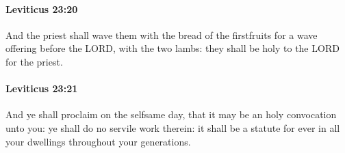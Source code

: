 		\paragraph{Leviticus 23:20} %
			\label{LEVITICUS-23-20}

			And the priest shall wave them with the bread of the firstfruits for a wave offering before the LORD, with the two lambs: they shall be holy to the LORD for the priest.


		\paragraph{Leviticus 23:21} %
			\label{LEVITICUS-23-21}

			And ye shall proclaim on the selfsame day, that it may be an holy convocation unto you: ye shall do no servile work therein: it shall be a statute for ever in all your dwellings throughout your generations.

